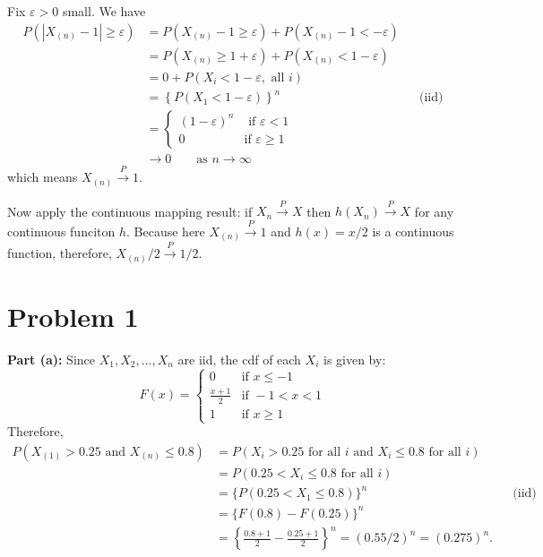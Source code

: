 \documentclass[
]{article}
\begin{document}
Fix \(\varepsilon> 0\) small. We have \[
\begin{aligned}
P(|X_{(n)} - 1| \geq \varepsilon) &= P(X_{(n)} - 1 \geq \varepsilon) + P(X_{(n)} - 1 < -\varepsilon) \\
&=  P(X_{(n)} \geq 1 + \varepsilon) + P(X_{(n)}  < 1 -\varepsilon) \\
&= 0 + P(X_i < 1 -\varepsilon, \text{ all } i) \\
&= \left\{P(X_1 < 1-\varepsilon)\right\}^n && \text{(iid)} \\
&= \begin{cases}
\left(1-\varepsilon\right)^n & \text{ if } \varepsilon< 1 \\
0 & \text{if } \varepsilon\geq 1
\end{cases} \\
&\to  0 \qquad \text{as } {n \to \infty}
\end{aligned}
\] which means \(X_{(n)} \xrightarrow{P} 1\).

Now apply the continuous mapping result: if \(X_n \xrightarrow{P} X\)
then \(h(X_n) \xrightarrow{P} X\) for any continuous funciton \(h\).
Because here \(X_{(n)} \xrightarrow{P} 1\) and \(h(x) = x/2\) is a
continuous function, therefore, \(X_{(n)}/2 \xrightarrow{P} 1/2\).

\newcommand{\rs}{X_1,X_2,\dots,X_n}
\newcommand{\on}{\operatorname}
\newcommand{\enter}{\vspace{0.1in}}
\newcommand{\ds}{\displaystyle}
\renewcommand{\bar}{\overline}
\newcommand{\N}{\text{N}}
\renewcommand{\epsilon}{\varepsilon}
\newcommand{\R}{\mathbb{R}}
\newcommand{\Ss}{\mathcal{S}}
\newcommand{\E}{\on{E}}
\newcommand{\var}{\on{Var}}

\renewcommand{\vec}{\underline}
\newcommand{\asim}{\stackrel{a}{\sim}}
\newcommand{\points}[1]{\hfill \textbf{(#1 pts)}}

\hypertarget{problem-1-1}{%
\section{Problem 1}\label{problem-1-1}}

\textbf{Part (a):} Since \(X_1,X_2,\dots,X_n\) are iid, the cdf of each
\(X_i\) is given by: \[
F(x) = \begin{cases}
0 & \text{if } x \leq -1 \\
\frac{x+1}{2} & \text{if } - 1 < x < 1 \\
1 & \text{if } x \geq 1
\end{cases}
\] Therefore, \[
\begin{aligned}
P\left(X_{(1)} > 0.25 \text{ and } X_{(n)} \leq 0.8\right) 
&= P\left(X_i > 0.25 \text{ for all } i \text{ and } X_{i} \leq 0.8 \text{ for all } i \right) \\
&= P(0.25 < X_i \leq 0.8 \text{ for all } i) \\
&= \{P(0.25 < X_1 \leq 0.8)\}^n && \text{(iid)} \\
&= \{F(0.8) - F(0.25) \}^n  \\
&= \left\{\frac{0.8+1}{2} - \frac{0.25+1}{2} \right\}^n = (0.55/2)^n = \boxed{(0.275)^n}.
\end{aligned}
\]
\end{document}

